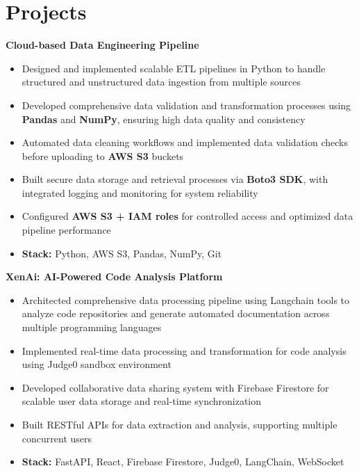 \documentclass[10pt, letterpaper]{article}
\newenvironment{highlights}{
    \begin{itemize}[
        topsep=0.1cm,
        parsep=0.1cm,
        itemsep=3pt,
        leftmargin=10pt
    ]
}{
    \end{itemize}
}
\newenvironment{twocolentry}[2][]{
    \noindent\textbf{#2} \hfill {\small #1}\par
}{}
\begin{document}
\section{Projects}
\begin{twocolentry}{Cloud-based Data Engineering Pipeline}
\end{twocolentry}
\begin{highlights}
    \item Designed and implemented scalable ETL pipelines in Python to handle structured and unstructured data ingestion from multiple sources
    \item Developed comprehensive data validation and transformation processes using \textbf{Pandas} and \textbf{NumPy}, ensuring high data quality and consistency
    \item Automated data cleaning workflows and implemented data validation checks before uploading to \textbf{AWS S3} buckets
    \item Built secure data storage and retrieval processes via \textbf{Boto3 SDK}, with integrated logging and monitoring for system reliability
    \item Configured \textbf{AWS S3 + IAM roles} for controlled access and optimized data pipeline performance
    \item \textbf{Stack:} Python, AWS S3, Pandas, NumPy, Git
\end{highlights}

\begin{twocolentry}{XenAi: AI-Powered Code Analysis Platform}
\end{twocolentry}
\begin{highlights}
    \item Architected comprehensive data processing pipeline using Langchain tools to analyze code repositories and generate automated documentation across multiple programming languages
    \item Implemented real-time data processing and transformation for code analysis using Judge0 sandbox environment
    \item Developed collaborative data sharing system with Firebase Firestore for scalable user data storage and real-time synchronization
    \item Built RESTful APIs for data extraction and analysis, supporting multiple concurrent users
    \item \textbf{Stack:} FastAPI, React, Firebase Firestore, Judge0, LangChain, WebSocket
\end{highlights}
\end{document}
